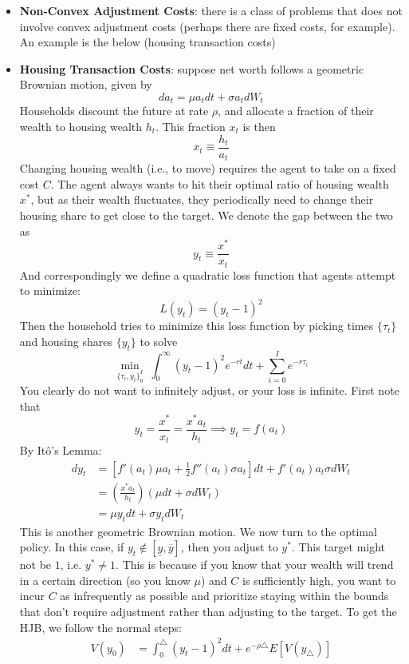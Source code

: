 \documentclass[12pt]{article}
\begin{document}
\begin{itemize}
    \item \textbf{Non-Convex Adjustment Costs}: there is a class of problems that does not involve convex adjustment costs (perhaps there are fixed costs, for example). An example is the below (housing transaction costs)
    \item \textbf{Housing Transaction Costs}: suppose net worth follows a geometric Brownian motion, given by
    \[da_t = \mu a_t dt + \sigma a_t dW_t\]
    Households discount the future at rate $\rho$, and allocate a fraction of their wealth to housing wealth $h_t$. This fraction $x_t$ is then
    \[x_t \equiv \frac{h_t}{a_t}\]
    Changing housing wealth (i.e., to move) requires the agent to take on a fixed cost $C$. The agent always wants to hit their optimal ratio of housing wealth $x^*$, but as their wealth fluctuates, they periodically need to change their housing share to get close to the target. We denote the gap between the two as
    \[y_t \equiv \frac{x^*}{x_t}\]
    And correspondingly we define a quadratic loss function that agents attempt to minimize:
    \[L(y_t) = (y_t - 1)^2\]
    Then the household tries to minimize this loss function by picking times $\{\tau_t\}$ and housing shares $\{y_t\}$ to solve
    \[\min_{\{\tau_i,y_i\}_0^{I}}\;\int_0^{\infty}\left(y_t-1\right)^2e^{-rt}dt + \sum_{i=0}^{I}e^{-r\tau_i}\]
    You clearly do not want to infinitely adjust, or your loss is infinite. First note that
    \[y_t = \frac{x^*}{x_t} = \frac{x^*a_t}{h_t} \implies y_t = f(a_t)\]
    By Itô's Lemma:
    \[\begin{split}
        dy_t &= \left[f'(a_t)\mu a_t + \frac{1}{2}f''(a_t) \sigma a_t\right]dt + f'(a_t)a_t\sigma dW_t \\
        &= \left(\frac{x^*a_t}{h_t}\right)\left(\mu dt + \sigma dW_t\right) \\
        &= \mu y_t dt + \sigma y_t dW_t
    \end{split}\]
    This is another geometric Brownian motion. We now turn to the optimal policy. In this case, if $y_t \notin [\underline{y}, \overline{y}]$, then you adjust to $y^*$. This target might not be $1$, i.e. $y^* \neq 1$. This is because if you know that your wealth will trend in a certain direction (so you know $\mu$) and $C$ is sufficiently high, you want to incur $C$ as infrequently as possible and prioritize staying within the bounds that don't require adjustment rather than adjusting to the target. To get the HJB, we follow the normal steps:
    \[\begin{split}
        V(y_0) &= \int_0^{\triangle}(y_t - 1)^2dt + e^{-\rho\triangle}E[V(y_{\triangle})] \\

\end{split}\]
\end{itemize}
\end{document}
